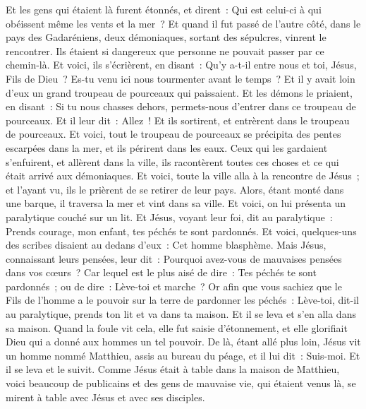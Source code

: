 \begin{multicols}{2}
Et les gens qui étaient là furent étonnés, et dirent~: Qui est celui-ci à qui obéissent même les vents et la mer~?
Et quand il fut passé de l'autre côté, dans le pays des Gadaréniens, deux démoniaques, sortant des sépulcres, vinrent le rencontrer. Ils étaient si dangereux que personne ne pouvait passer par ce chemin-là.
Et voici, ils s'écrièrent, en disant~: Qu'y a-t-il entre nous et toi, Jésus, Fils de Dieu~? Es-tu venu ici nous tourmenter avant le temps~?
Et il y avait loin d'eux un grand troupeau de pourceaux qui paissaient.
Et les démons le priaient, en disant~: Si tu nous chasses dehors, permets-nous d'entrer dans ce troupeau de pourceaux.
Et il leur dit~: Allez~! Et ils sortirent, et entrèrent dans le troupeau de pourceaux. Et voici, tout le troupeau de pourceaux se précipita des pentes escarpées dans la mer, et ils périrent dans les eaux.
Ceux qui les gardaient s'enfuirent, et allèrent dans la ville, ils racontèrent toutes ces choses et ce qui était arrivé aux démoniaques.
Et voici, toute la ville alla à la rencontre de Jésus~; et l'ayant vu, ils le prièrent de se retirer de leur pays.
\VerseOne{}Alors, étant monté dans une barque, il traversa la mer et vint dans sa ville.
Et voici, on lui présenta un paralytique couché sur un lit. Et Jésus, voyant leur foi, dit au paralytique~: Prends courage, mon enfant, tes péchés te sont pardonnés.
Et voici, quelques-uns des scribes disaient au dedans d'eux~: Cet homme blasphème.
Mais Jésus, connaissant leurs pensées, leur dit~: Pourquoi avez-vous de mauvaises pensées dans vos cœurs~?
Car lequel est le plus aisé de dire~: Tes péchés te sont pardonnés~; ou de dire~: Lève-toi et marche~?
Or afin que vous sachiez que le Fils de l'homme a le pouvoir sur la terre de pardonner les péchés~: Lève-toi, dit-il au paralytique, prends ton lit et va dans ta maison.
Et il se leva et s'en alla dans sa maison.
Quand la foule vit cela, elle fut saisie d'étonnement, et elle glorifiait Dieu qui a donné aux hommes un tel pouvoir.
De là, étant allé plus loin, Jésus vit un homme nommé Matthieu, assis au bureau du péage, et il lui dit~: Suis-moi. Et il se leva et le suivit.
Comme Jésus était à table dans la maison de Matthieu, voici beaucoup de publicains et des gens de mauvaise vie, qui étaient venus là, se mirent à table avec Jésus et avec ses disciples.

\end{multicols}
